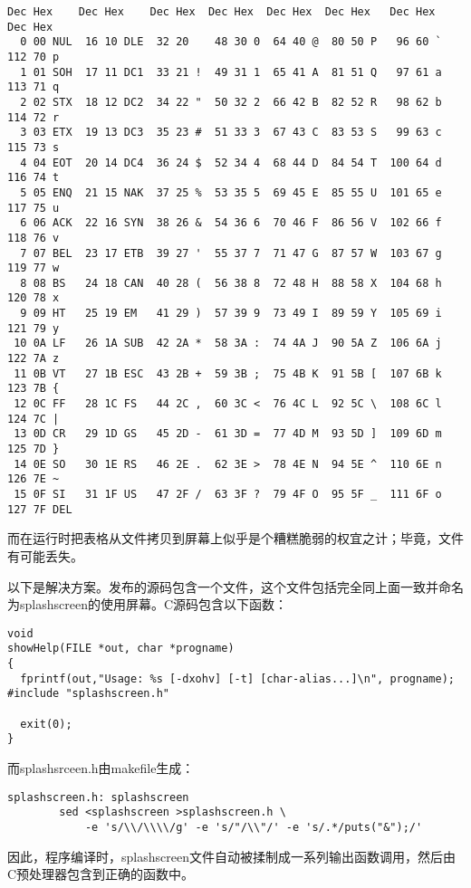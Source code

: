 \documentclass[12pt,oneside]{book}
\begin{document}
\begin{common-format}
\begin{Verbatim}[label=例9.5 ascii用法屏幕]
Dec Hex    Dec Hex    Dec Hex  Dec Hex  Dec Hex  Dec Hex   Dec Hex   Dec Hex
  0 00 NUL  16 10 DLE  32 20    48 30 0  64 40 @  80 50 P   96 60 `  112 70 p
  1 01 SOH  17 11 DC1  33 21 !  49 31 1  65 41 A  81 51 Q   97 61 a  113 71 q
  2 02 STX  18 12 DC2  34 22 "  50 32 2  66 42 B  82 52 R   98 62 b  114 72 r
  3 03 ETX  19 13 DC3  35 23 #  51 33 3  67 43 C  83 53 S   99 63 c  115 73 s
  4 04 EOT  20 14 DC4  36 24 $  52 34 4  68 44 D  84 54 T  100 64 d  116 74 t
  5 05 ENQ  21 15 NAK  37 25 %  53 35 5  69 45 E  85 55 U  101 65 e  117 75 u
  6 06 ACK  22 16 SYN  38 26 &  54 36 6  70 46 F  86 56 V  102 66 f  118 76 v
  7 07 BEL  23 17 ETB  39 27 '  55 37 7  71 47 G  87 57 W  103 67 g  119 77 w
  8 08 BS   24 18 CAN  40 28 (  56 38 8  72 48 H  88 58 X  104 68 h  120 78 x
  9 09 HT   25 19 EM   41 29 )  57 39 9  73 49 I  89 59 Y  105 69 i  121 79 y
 10 0A LF   26 1A SUB  42 2A *  58 3A :  74 4A J  90 5A Z  106 6A j  122 7A z
 11 0B VT   27 1B ESC  43 2B +  59 3B ;  75 4B K  91 5B [  107 6B k  123 7B {
 12 0C FF   28 1C FS   44 2C ,  60 3C <  76 4C L  92 5C \  108 6C l  124 7C |
 13 0D CR   29 1D GS   45 2D -  61 3D =  77 4D M  93 5D ]  109 6D m  125 7D }
 14 0E SO   30 1E RS   46 2E .  62 3E >  78 4E N  94 5E ^  110 6E n  126 7E ~
 15 0F SI   31 1F US   47 2F /  63 3F ?  79 4F O  95 5F _  111 6F o  127 7F DEL
\end{Verbatim}

而在运行时把表格从文件拷贝到屏幕上似乎是个糟糕脆弱的权宜之计；毕竟，文件有可能丢失。

以下是解决方案。发布的源码包含一个文件，这个文件包括完全同上面一致并命名为splashscreen的使用屏幕。C源码包含以下函数：

\begin{Verbatim}
void 
showHelp(FILE *out, char *progname) 
{
  fprintf(out,"Usage: %s [-dxohv] [-t] [char-alias...]\n", progname);
#include "splashscreen.h"

  exit(0);
}
\end{Verbatim}

而splashsrceen.h由makefile生成：

\begin{Verbatim}
splashscreen.h: splashscreen
        sed <splashscreen >splashscreen.h \
            -e 's/\\/\\\\/g' -e 's/"/\\"/' -e 's/.*/puts("&");/' 
\end{Verbatim}

因此，程序编译时，splashscreen文件自动被揉制成一系列输出函数调用，然后由C预处理器包含到正确的函数中。


\end{common-format}
\end{document}
